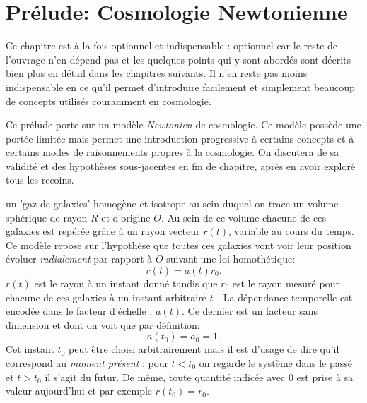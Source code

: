 \chapter{Prélude: Cosmologie Newtonienne}

Ce chapitre est à la fois optionnel et indispensable : optionnel car le reste de l'ouvrage n'en dépend pas et les quelques points qui y sont abordés sont décrits bien plus en détail dans les chapitres suivants. Il n'en reste pas moins indispensable en ce qu'il permet d'introduire facilement et simplement beaucoup de concepts utilisés couramment en cosmologie.

Ce prélude porte sur un modèle \textit{Newtonien} de cosmologie. Ce modèle possède une portée limitée mais permet une introduction progressive à certains concepts et à certains modes de raisonnements propres à la cosmologie. On discutera de sa validité et des hypothèses sous-jacentes en fin de chapitre, après en avoir exploré tous les recoins.

 un 'gaz de galaxies'  homogène et isotrope au sein duquel on trace un volume sphérique de rayon $R$ et d'origine $O$. Au sein de ce volume chacune de ces galaxies est repérée grâce à un rayon vecteur $r(t)$, variable au cours du temps. Ce modèle repose sur l'hypothèse que toutes ces galaxies vont voir leur position évoluer \textit{radialement} par rapport à $O$ suivant une loi homothétique:
\begin{equation}
r(t)=a(t)r_0.
\end{equation}
$r(t)$ est le rayon à un instant donné tandis que $r_0$ est le rayon mesuré pour chacune de ces galaxies à un instant arbitraire $t_0$. La dépendance temporelle est encodée dans le facteur d'échelle , $a(t)$. Ce dernier est un facteur sans dimension et dont on voit que par définition:
\begin{equation}
a(t_0)=a_0=1.
\end{equation}
Cet instant $t_0$ peut être choisi arbitrairement mais il est d'usage de dire qu'il correspond au \textit{moment présent} : pour $t<t_0$ on regarde le système dans le passé et $t>t_0$ il s'agit du futur. De même, toute quantité indicée avec $0$ est prise à sa valeur aujourd'hui et par exemple $r(t_0)=r_0$.

